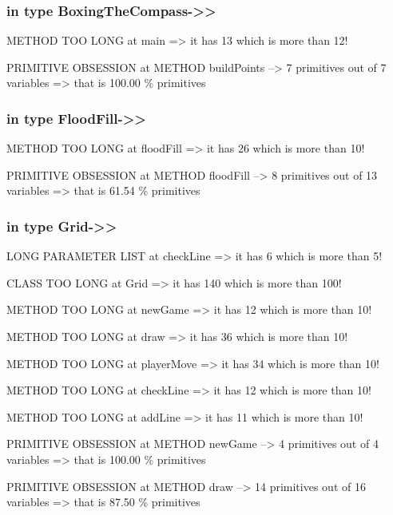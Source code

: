 \documentclass[a4paper]{article}
\begin{document}
\begin{flushleft}
	\subsubsection{in type
		BoxingTheCompass-\textgreater{}\textgreater{}}\label{in-type-boxingthecompass-}

	METHOD TOO LONG at main =\textgreater{} it has 13 which is more than 12!

	PRIMITIVE OBSESSION at METHOD buildPoints --\textgreater{} 7 primitives
	out of 7 variables =\textgreater{} that is 100.00 \% primitives

	\subsubsection{in type
		FloodFill-\textgreater{}\textgreater{}}\label{in-type-floodfill-}

	METHOD TOO LONG at floodFill =\textgreater{} it has 26 which is more
	than 10!

	PRIMITIVE OBSESSION at METHOD floodFill --\textgreater{} 8 primitives
	out of 13 variables =\textgreater{} that is 61.54 \% primitives

	\subsubsection{in type Grid-\textgreater{}\textgreater{}}\label{in-type-grid-}

	LONG PARAMETER LIST at checkLine =\textgreater{} it has 6 which is more
	than 5!

	CLASS TOO LONG at Grid =\textgreater{} it has 140 which is more than
	100!

	METHOD TOO LONG at newGame =\textgreater{} it has 12 which is more than
	10!

	METHOD TOO LONG at draw =\textgreater{} it has 36 which is more than 10!

	METHOD TOO LONG at playerMove =\textgreater{} it has 34 which is more
	than 10!

	METHOD TOO LONG at checkLine =\textgreater{} it has 12 which is more
	than 10!

	METHOD TOO LONG at addLine =\textgreater{} it has 11 which is more than
	10!

	PRIMITIVE OBSESSION at METHOD newGame --\textgreater{} 4 primitives out
	of 4 variables =\textgreater{} that is 100.00 \% primitives

	PRIMITIVE OBSESSION at METHOD draw --\textgreater{} 14 primitives out of
	16 variables =\textgreater{} that is 87.50 \% primitives


\end{flushleft}
\end{document}
